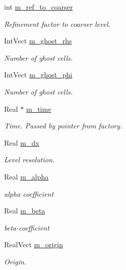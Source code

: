 \begin{DoxyCompactItemize}
int \hyperlink{classmfconductivityop_a9045e6b84c21fda0b0ab77ff1f949553}{m\+\_\+ref\+\_\+to\+\_\+coarser}
\begin{DoxyCompactList}\small\item\em Refinement factor to coarser level. \end{DoxyCompactList}\item 
Int\+Vect \hyperlink{classmfconductivityop_a06b47567363fd09422626e794455f179}{m\+\_\+ghost\+\_\+rhs}
\begin{DoxyCompactList}\small\item\em Number of ghost cells. \end{DoxyCompactList}\item 
Int\+Vect \hyperlink{classmfconductivityop_ac9123b56a508d85fe8e71bd4cd951d5a}{m\+\_\+ghost\+\_\+phi}
\begin{DoxyCompactList}\small\item\em Number of ghost cells. \end{DoxyCompactList}\item 
Real $\ast$ \hyperlink{classmfconductivityop_a9cb8c6fcd4bbaa222cc75f21ed457c32}{m\+\_\+time}
\begin{DoxyCompactList}\small\item\em Time. Passed by pointer from factory. \end{DoxyCompactList}\item 
Real \hyperlink{classmfconductivityop_ab601f3f001b6fee6c70732cc830c69d6}{m\+\_\+dx}
\begin{DoxyCompactList}\small\item\em Level resolution. \end{DoxyCompactList}\item 
Real \hyperlink{classmfconductivityop_afc24218470ca35014bd351e7b4c6cf20}{m\+\_\+alpha}
\begin{DoxyCompactList}\small\item\em alpha coefficient \end{DoxyCompactList}\item 
Real \hyperlink{classmfconductivityop_a88f6df6137157fe0bff4ac674ab1c2d5}{m\+\_\+beta}
\begin{DoxyCompactList}\small\item\em beta-\/coefficient \end{DoxyCompactList}\item 
Real\+Vect \hyperlink{classmfconductivityop_abe60c58d994c4ff79a8621418b2e7141}{m\+\_\+origin}
\begin{DoxyCompactList}\small\item\em Origin. \end{DoxyCompactList}\item 

\end{DoxyCompactItemize}
